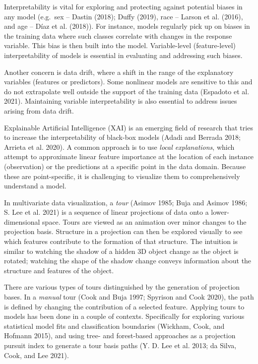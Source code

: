 \documentclass[
]{article}
\begin{document}
Interpretability is vital for exploring and protecting against potential
biases in any model (e.g.~sex -- Dastin (2018); Duffy (2019), race --
Larson et al. (2016), and age -- Díaz et al. (2018)). For instance,
models regularly pick up on biases in the training data where such
classes correlate with changes in the response variable. This bias is
then built into the model. Variable-level (feature-level)
interpretability of models is essential in evaluating and addressing
such biases.

Another concern is data drift, where a shift in the range of the
explanatory variables (features or predictors). Some nonlinear models
are sensitive to this and do not extrapolate well outside the support of
the training data (Espadoto et al. 2021). Maintaining variable
interpretability is also essential to address issues arising from data
drift.

Explainable Artificial Intelligence (XAI) is an emerging field of
research that tries to increase the interpretability of black-box models
(Adadi and Berrada 2018; Arrieta et al. 2020). A common approach is to
use \emph{local explanations}, which attempt to approximate linear
feature importance at the location of each instance (observation) or the
predictions at a specific point in the data domain. Because these are
point-specific, it is challenging to visualize them to comprehensively
understand a model.

In multivariate data visualization, a \emph{tour} (Asimov 1985; Buja and
Asimov 1986; S. Lee et al. 2021) is a sequence of linear projections of
data onto a lower-dimensional space. Tours are viewed as an animation
over minor changes to the projection basis. Structure in a projection
can then be explored visually to see which features contribute to the
formation of that structure. The intuition is similar to watching the
shadow of a hidden 3D object change as the object is rotated; watching
the shape of the shadow change conveys information about the structure
and features of the object.

There are various types of tours distinguished by the generation of
projection bases. In a \emph{manual} tour (Cook and Buja 1997; Spyrison
and Cook 2020), the path is defined by changing the contribution of a
selected feature. Applying tours to models has been done in a couple of
contexts. Specifically for exploring various statistical model fits and
classification boundaries (Wickham, Cook, and Hofmann 2015), and using
tree- and forest-based approaches as a projection pursuit index to
generate a tour basis paths (Y. D. Lee et al. 2013; da Silva, Cook, and
Lee 2021).
\end{document}
